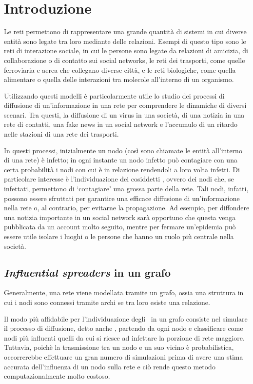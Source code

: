 \chapter{Introduzione}

Le reti permettono di rappresentare una grande quantità di sistemi in cui diverse entità 
sono legate tra loro mediante delle relazioni.
Esempi di questo tipo sono le reti di interazione sociale, in cui le persone sono legate 
da relazioni di amicizia, di collaborazione o di contatto sui social networks, 
le reti dei trasporti, come quelle ferroviaria e aerea
che collegano diverse città, e le reti biologiche, come quella alimentare o
quella delle interazioni tra molecole all'interno di un organismo.

Utilizzando questi modelli è particolarmente utile lo studio dei processi di diffusione
di un'informazione in una rete per comprendere le dinamiche di diversi scenari.
Tra questi, la diffusione di un virus in una società, di una notizia in una rete di contatti, 
una fake news in un social network e l'accumulo di un ritardo nelle stazioni di una rete 
dei trasporti.

In questi processi, inizialmente un nodo (così sono chiamate le entità all'interno di una rete) 
è infetto; in ogni instante un nodo infetto può contagiare con una certa probabilità i 
nodi con cui è in relazione rendendoli a loro volta infetti.
Di particolare interesse è l'individuazione dei cosiddetti \infsp, ovvero dei nodi
che, se infettati, permettono di `contagiare' una grossa parte della rete.
Tali nodi, infatti, possono essere sfruttati per garantire una efficace diffusione 
di un'informazione nella rete o, al contrario, per evitarne la propagazione.
Ad esempio, per diffondere una notizia importante in un social network sarà opportuno che 
questa venga pubblicata da un account molto seguito, mentre per fermare un'epidemia 
può essere utile isolare i luoghi o le persone che hanno un ruolo più centrale
nella società.


\section{\textit{Influential spreaders} in un grafo}

Generalmente, una rete viene modellata tramite un grafo, ossia una struttura in cui i 
nodi sono connessi tramite archi se tra loro esiste una relazione.

Il modo più affidabile per l'individuazione degli \infsp\ in un grafo consiste nel 
simulare il processo di diffusione, detto anche \spproc, partendo da ogni nodo e 
classificare come nodi più 
influenti quelli da cui si riesce ad infettare la porzione di rete maggiore.
Tuttavia, poichè la trasmissione tra un nodo e un suo vicino è probabilistica,
occorrerebbe effettuare un gran numero di simulazioni prima di avere una stima accurata 
dell'influenza di un nodo sulla rete e ciò rende questo metodo computazionalmente 
molto costoso.

